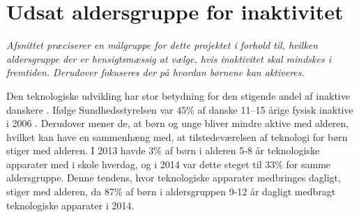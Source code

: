 \section {Udsat aldersgruppe for inaktivitet}
\textit{Afsnittet præciserer en målgruppe for dette projektet i forhold til, hvilken aldersgruppe der er hensigtsmæssig at vælge, hvis inaktivitet skal mindskes i fremtiden. Derudover fokuseres der på hvordan børnene kan aktiveres.}

Den teknologiske udvikling har stor betydning for den stigende andel af inaktive danskere %
\citep{Kiens2007}. Ifølge Sundhedsstyrelsen var 45\% af danske 11–15 årige fysisk inaktive i 2006 \citep{Sundhedsstyrelsen2006}. Derudover mener de, at børn og unge bliver mindre aktive med alderen, hvilket kan have en sammenhæng med, at tilstedeværelsen af teknologi for børn stiger med alderen. %
I 2013 havde 3\% af børn i alderen 5-8 år teknologiske apparater med i skole hverdag, og i 2014 var dette steget til 33\% for samme aldersgruppe. Denne tendens, hvor teknologiske apparater medbringes dagligt, stiger med alderen, da 87\% af børn i aldersgruppen 9-12 år dagligt medbragt teknologiske apparater i 2014. \citep{Sundhedsstyrelsen2006,GjensidigeForsikring2014}


